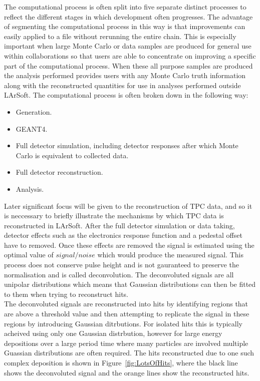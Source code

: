 The computational process is often split into five separate distinct processes to reflect the different stages in which development often progresses. The advantage of segmenting the computational process in this way is that improvements can easily applied to a file without rerunning the entire chain. This is especially important when large Monte Carlo or data samples are produced for general use within collaborations so that users are able to concentrate on improving a specific part of the computational process. When these all purpose samples are produced the analysis performed provides users with any Monte Carlo truth information along with the reconstructed quantities for use in analyses performed outside LArSoft. The computational process is often broken down in the following way:
\begin{itemize}
\item Generation.
\item GEANT4.
\item Full detector simulation, including detector responses after which Monte Carlo is equivalent to collected data.
\item Full detector reconstruction.
\item Analysis.
\end{itemize}

Later significant focus will be given to the reconstruction of TPC data, and so it is neccessary to briefly illustrate the mechanisms by which TPC data is reconstructed in LArSoft. After the full detector simulation or data taking, detector effects such as the electronics response function and a pedestal offset have to removed. Once these effects are removed the signal is estimated using the optimal value of $signal/noise$ which would produce the measured signal. This process does not conserve pulse height and is not gauranteed to preserve the normalisation and is called deconvolution. The deconvoluted signals are all unipolar distributions which means that Gaussian distributions can then be fitted to them when trying to reconstruct hits. \\

The deconvoluted signals are reconstructed into hits by identifying regions that are above a threshold value and then attempting to replicate the signal in these regions by introducing Gaussian ditrbutions. For isolated hits this is typically acheived using only one Gaussian distrbution, however for large energy depositions over a large period time where many particles are involved multiple Guassian distributions are often required. The hits reconstructed due to one such complex deposition is shown in Figure~\ref{fig:LotsOfHits}, where the black line shows the deconvoluted signal and the orange lines show the reconstructed hits. \\

